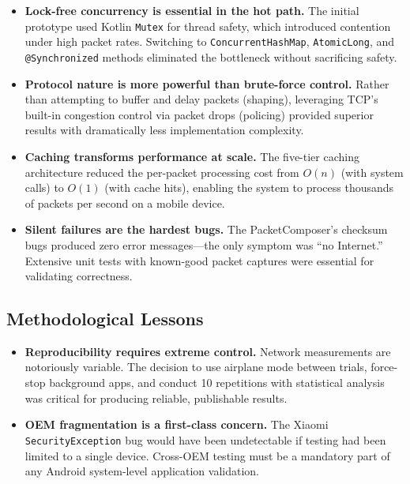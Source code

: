\begin{itemize}
    \item \textbf{Lock-free concurrency is essential in the hot path.} The initial prototype used Kotlin \texttt{Mutex} for thread safety, which introduced contention under high packet rates. Switching to \texttt{ConcurrentHashMap}, \texttt{AtomicLong}, and \texttt{@Synchronized} methods eliminated the bottleneck without sacrificing safety.
    
    \item \textbf{Protocol nature is more powerful than brute-force control.} Rather than attempting to buffer and delay packets (shaping), leveraging TCP's built-in congestion control via packet drops (policing) provided superior results with dramatically less implementation complexity.
    
    \item \textbf{Caching transforms performance at scale.} The five-tier caching architecture reduced the per-packet processing cost from $O(n)$ (with system calls) to $O(1)$ (with cache hits), enabling the system to process thousands of packets per second on a mobile device.
    
    \item \textbf{Silent failures are the hardest bugs.} The PacketComposer's checksum bugs produced zero error messages---the only symptom was ``no Internet.'' Extensive unit tests with known-good packet captures were essential for validating correctness.
\end{itemize}

\subsection{Methodological Lessons}

\begin{itemize}
    \item \textbf{Reproducibility requires extreme control.} Network measurements are notoriously variable. The decision to use airplane mode between trials, force-stop background apps, and conduct 10 repetitions with statistical analysis was critical for producing reliable, publishable results.
    
    \item \textbf{OEM fragmentation is a first-class concern.} The Xiaomi \texttt{SecurityException} bug would have been undetectable if testing had been limited to a single device. Cross-OEM testing must be a mandatory part of any Android system-level application validation.
\end{itemize}

